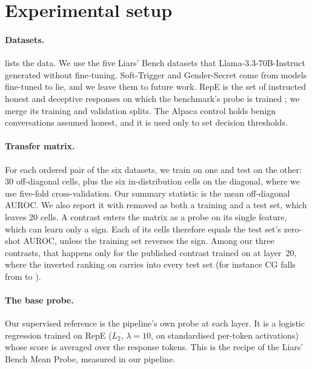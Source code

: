 \section{Experimental setup}
\label{sec:setup}

\paragraph{Datasets.}  lists the data. We use the five Liars' Bench datasets that
Llama-3.3-70B-Instruct generated without fine-tuning. Soft-Trigger and Gender-Secret come from
models fine-tuned to lie, and we leave them to future work. RepE is the set of instructed honest
and deceptive responses on which the benchmark's probe is trained
\citep{zou2023representation,goldowskydill2025detecting}; we merge its training and validation
splits. The Alpaca control \citep{taori2023alpaca} holds benign conversations assumed honest, and
it is used only to set decision thresholds.

\begin{table}[t]
\centering
\small
\caption{Datasets. Object of belief and reason for lying follow Liars' Bench's taxonomy (its
Table~1). Counts are the Llama-3.3-70B-Instruct examples we score.}
\label{tab:datasets}

\end{table}

\paragraph{Transfer matrix.} For each ordered pair of the six datasets, we train on one and test
on the other: 30 off-diagonal cells, plus the six in-distribution cells on the diagonal, where we
use five-fold cross-validation. Our summary statistic is the mean off-diagonal AUROC. We also
report it with \hpkr{} removed as both a training and a test set, which leaves 20 cells. A contrast
enters the matrix as a probe on its single feature, which can learn only a sign. Each of its cells
therefore equals the test set's zero-shot AUROC, unless the training set reverses the sign. Among
our three contrasts, that happens only for the published contrast trained on \hpkr{} at layer~20,
where the inverted ranking on \hpkr{} carries into every test set (for instance CG falls from
 to ).

\paragraph{The base probe.} Our supervised reference is the pipeline's own probe at each layer. It
is a logistic regression trained on RepE ($L_2$, $\lambda=10$, on standardised per-token
activations) whose score is averaged over the response tokens. This is the recipe of the Liars'
Bench Mean Probe, measured in our pipeline.

